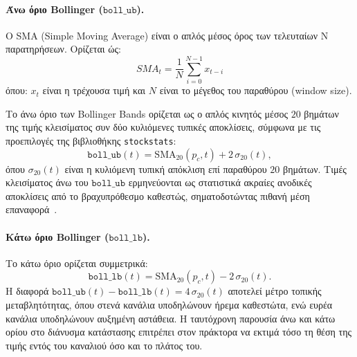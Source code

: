 \paragraph{Άνω όριο Bollinger ($\mathtt{boll\_ub}$).}
O SMA (Simple Moving Average) είναι ο απλός μέσος όρος των τελευταίων N παρατηρήσεων. 
Ορίζεται ώς:
\begin{equation}
  SMA_t = \frac{1}{N}\sum_{i=0}^{N-1} x_{t-i}
\end{equation}
όπου: $x_{t}$ είναι η τρέχουσα τιμή και $N$ είναι το μέγεθος του παραθύρου (window size).

Το άνω όριο των Bollinger Bands ορίζεται ως ο απλός κινητός μέσος $20$
βημάτων της τιμής κλεισίματος συν δύο κυλιόμενες τυπικές αποκλίσεις, σύμφωνα
με τις προεπιλογές της βιβλιοθήκης \texttt{stockstats}:
\begin{equation}
  \mathtt{boll\_ub}(t) = \mathrm{SMA}_{20}(p_c, t) + 2\,\sigma_{20}(t),
  \label{eq:bollub}
\end{equation}
όπου $\sigma_{20}(t)$ είναι η κυλιόμενη τυπική απόκλιση επί παραθύρου $20$
βημάτων. Τιμές κλεισίματος άνω του $\mathtt{boll\_ub}$ ερμηνεύονται ως
στατιστικά ακραίες ανοδικές αποκλίσεις από το βραχυπρόθεσμο καθεστώς,
σηματοδοτώντας πιθανή μέση επαναφορά~\cite{murphy1999technical}.

\paragraph{Κάτω όριο Bollinger ($\mathtt{boll\_lb}$).}
Το κάτω όριο ορίζεται συμμετρικά:
\begin{equation}
  \mathtt{boll\_lb}(t) = \mathrm{SMA}_{20}(p_c, t) - 2\,\sigma_{20}(t).
  \label{eq:bolllb}
\end{equation}
Η διαφορά $\mathtt{boll\_ub}(t) - \mathtt{boll\_lb}(t) = 4\,\sigma_{20}(t)$
αποτελεί μέτρο τοπικής μεταβλητότητας, όπου στενά κανάλια υποδηλώνουν ήρεμα
καθεστώτα, ενώ ευρέα κανάλια υποδηλώνουν αυξημένη αστάθεια. Η ταυτόχρονη
παρουσία άνω και κάτω ορίου στο διάνυσμα κατάστασης επιτρέπει στον πράκτορα
να εκτιμά τόσο τη θέση της τιμής εντός του καναλιού όσο και το πλάτος του.

